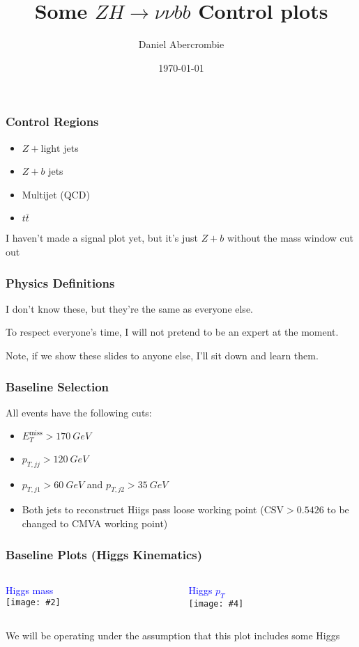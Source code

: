 \documentclass{beamer}
\author[D. Abercrombie]{
  Daniel Abercrombie
}
\title{\bf \sffamily Some $ZH \rightarrow \nu\nu bb$ Control plots}
\date{\today}
\newcommand{\twofigs}[4]{
  \begin{columns}
    \begin{column}{0.5\linewidth}
      \centering
      \textcolor{blue}{#1} \\
      \texttt{[image: \#2]}
    \end{column}
    \begin{column}{0.5\linewidth}
      \centering
      \textcolor{blue}{#3} \\
      \texttt{[image: \#4]}
    \end{column}
  \end{columns}
}
\newcommand{\ttbar}{\ensuremath{t\bar{t}}}
\newcommand{\MET}{\ensuremath{E_{T}^{\mathrm{miss}}}}
\begin{document}
\begin{frame}[nonumbering]
  \titlepage
\end{frame}

\begin{frame}
  \frametitle{Control Regions}
  \begin{itemize}
  \item $Z + \mathrm{light}$ jets
  \item $Z + b$ jets
  \item Multijet (QCD)
  \item \ttbar
  \end{itemize}
  I haven't made a signal plot yet,
  but it's just $Z + b$ without the mass window cut out
\end{frame}

\begin{frame}
  \frametitle{Physics Definitions}
  I don't know these, but they're the same as everyone else.

  \vspace{12pt}

  To respect everyone's time, I will not pretend to be an expert at the moment.

  \vspace{12pt}

  Note, if we show these slides to anyone else, I'll sit down and learn them.
\end{frame}

\begin{frame}
  \frametitle{Baseline Selection}
  All events have the following cuts:

  \begin{itemize}
  \item $\MET > \SI{170}{GeV}$
  \item $p_{T, jj} > \SI{120}{GeV}$
  \item $p_{T, j1} > \SI{60}{GeV}$ and $p_{T, j2} > \SI{35}{GeV}$
  \item Both jets to reconstruct Hiigs pass loose working point
    ($\mathrm{CSV} > 0.5426$ to be changed to CMVA working point)
  \end{itemize}
\end{frame}

\begin{frame}
  \frametitle{Baseline Plots (Higgs Kinematics)}
  \twofigs{Higgs mass}
          {171201/ZvvHbb_common_hbbm.pdf}
          {Higgs $p_T$}
          {171201/ZvvHbb_common_hbbpt.pdf}

  We will be operating under the assumption that this plot includes some Higgs
\end{frame}
\end{document}
